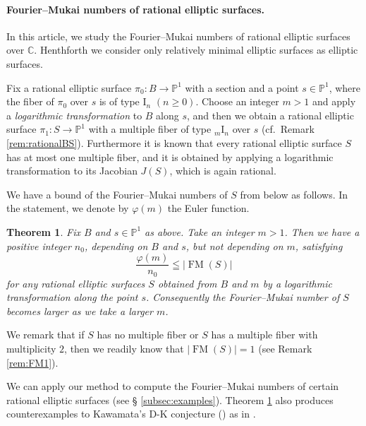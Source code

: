 \documentclass[a4paper,11pt]{article}
\newtheorem{thm}{Theorem}[section]
\theoremstyle{definition}\newtheorem{defn}[thm]{Definition}
\theoremstyle{remark}\newtheorem{remark}[thm]{Remark}
\numberwithin{equation}{section}
\newcommand{\FM}{\operatorname{FM}}
\newcommand{\rom}{\textrm}
\newcommand{\PP}{\mathbb P}
\newcommand{\C}{\mathbb C}
\begin{document}

\paragraph{Fourier--Mukai numbers of
rational  elliptic surfaces.}
%
In this article, we study the Fourier--Mukai numbers of
rational elliptic surfaces over $\C$.
Henthforth we consider only  
relatively minimal elliptic surfaces as elliptic surfaces.

Fix a rational elliptic surface
$\pi_0 \colon B\to \PP^1$ with a section and
a point $s\in\PP^1$, where
the fiber of $\pi_0$ over $s$ is of type $\rom{I}_n$ $(n\ge 0)$.
Choose an integer $m>1$ and 
apply a \emph{logarithmic transformation} to $B$ along $s$,
and then we obtain a rational  elliptic surface 
$\pi_1 \colon S\to \PP^1$ with 
a multiple fiber of type $_m\rom{I}_n$ over $s$
(cf.~Remark \ref{rem:rationalBS}). 
Furthermore it is known that every rational  elliptic 
surface $S$ has at most one multiple fiber,
and it is obtained  
by applying a logarithmic transformation to its Jacobian $J(S)$, 
which is again rational.

We have a bound of the Fourier--Mukai numbers of $S$
from below as follows.
In the statement, we denote by $\varphi(m)$ the Euler function.
 

\begin{thm}\label{thm:FMelliptic0}
Fix $B$ and $s\in \PP^1$ as above.
Take an integer $m>1$. 
Then we have a positive integer $n_0$, depending on $B$ and $s$, 
but not depending on $m$, satisfying
$$
\frac{\varphi (m)}{n_0} 
\leqq 
|\FM (S)|
$$ 
for any rational  elliptic surfaces 
$S$ obtained from $B$ and $m$
by a logarithmic transformation along the point $s$.
Consequently the Fourier--Mukai number of $S$ becomes larger
as we take a larger $m$.
\end{thm}


We remark that if $S$ has no multiple fiber  
or $S$ has a multiple fiber with multiplicity $2$, then 
we readily know that $|\FM (S)|=1$ (see Remark \ref{rem:FM1}). 
 
We can apply our method to compute the Fourier--Mukai 
numbers of certain rational  elliptic surfaces (see \S 
\ref{subsec:examples}).
Theorem \ref{thm:FMelliptic0} also produces
counterexamples to Kawamata's D-K conjecture (\cite{Ka02}) as in \cite{Ue04}. 
\end{document}
